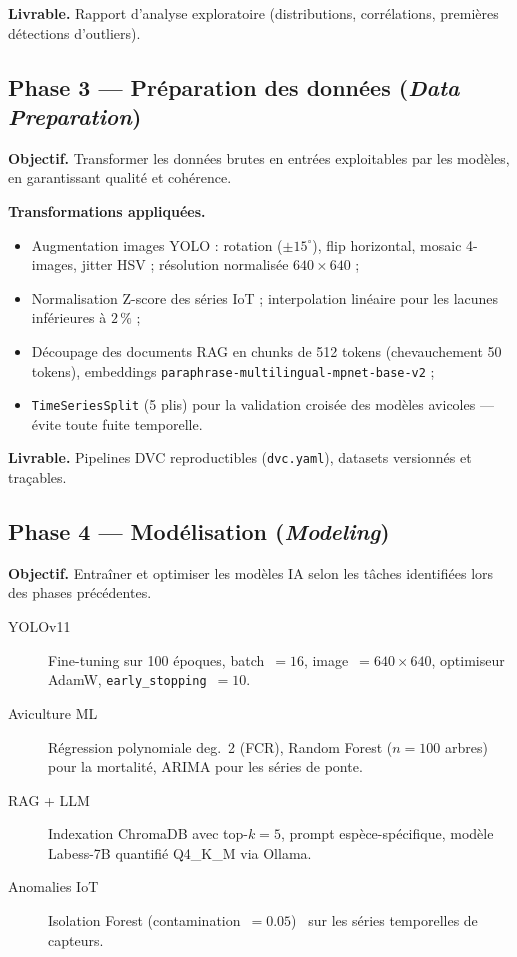 \textbf{Livrable.} Rapport d'analyse exploratoire (distributions, corrélations,
premières détections d'outliers).

\subsection*{Phase 3 --- Préparation des données (\textit{Data Preparation})}

\textbf{Objectif.} Transformer les données brutes en entrées exploitables par
les modèles, en garantissant qualité et cohérence.

\textbf{Transformations appliquées.}
\begin{itemize}
  \item Augmentation images YOLO : rotation ($\pm15^{\circ}$), flip horizontal,
        mosaic 4-images, jitter HSV ; résolution normalisée $640\times640$ ;
  \item Normalisation Z-score des séries IoT ; interpolation linéaire pour
        les lacunes inférieures à $2\,\%$ ;
  \item Découpage des documents RAG en chunks de 512 tokens (chevauchement
        50 tokens), embeddings \texttt{paraphrase-multilingual-mpnet-base-v2} ;
  \item \texttt{TimeSeriesSplit} (5 plis) pour la validation croisée des
        modèles avicoles --- évite toute fuite temporelle.
\end{itemize}

\textbf{Livrable.} Pipelines DVC reproductibles (\texttt{dvc.yaml}),
datasets versionnés et traçables.

\subsection*{Phase 4 --- Modélisation (\textit{Modeling})}

\textbf{Objectif.} Entraîner et optimiser les modèles IA selon les tâches
identifiées lors des phases précédentes.

\begin{description}
  \item[YOLOv11] Fine-tuning sur 100 époques, batch~$= 16$,
        image~$= 640\times640$, optimiseur AdamW,
        \texttt{early\_stopping}~$= 10$.
  \item[Aviculture ML] Régression polynomiale deg.~2 (FCR), Random Forest
        ($n = 100$ arbres) pour la mortalité, ARIMA pour les séries de ponte.
  \item[RAG + LLM] Indexation ChromaDB avec top-$k = 5$, prompt
        espèce-spécifique, modèle Labess-7B quantifié Q4\_K\_M via Ollama.
  \item[Anomalies IoT] Isolation Forest (contamination~$= 0.05$)~%
        \cite{liu2008isolation} sur les séries temporelles de capteurs.
\end{description}

